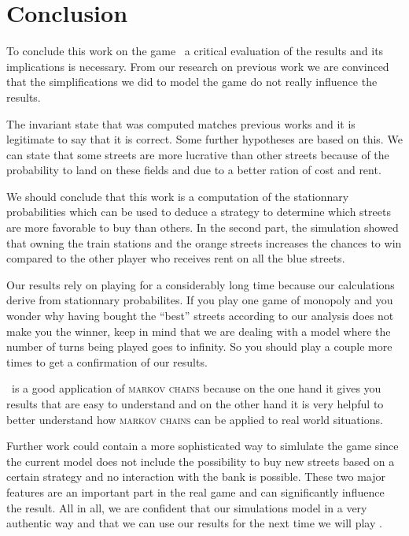 \section{Conclusion} %
\label{sec:conclusion}

To conclude this work on the game \monopoly~a critical evaluation of the results and its 
implications is necessary. From our research on previous work we are convinced that the 
simplifications we did to model the game do not really influence the results. 

The invariant state that was computed matches previous works and it is legitimate to say 
that it is correct. Some further hypotheses are based on this. 
We can state that some streets are more lucrative than other streets because of the 
probability to land on these fields and due to a better ration of cost and rent.

We should conclude that this work is a computation of the stationnary probabilities which can 
be used to deduce a strategy to determine which streets are more favorable to buy than others.
In the second part, the simulation showed that owning the train stations and the orange streets 
increases the chances to win compared to the other player who receives rent on all the blue 
streets. 

Our results rely on playing for a considerably long time because our calculations derive from 
stationnary probabilites. If you play one game of monopoly and you wonder why having bought the ``best'' 
streets according to our analysis does not make you the winner, keep in mind that we are dealing 
with a model where the number of turns being played goes to infinity. So you should play a couple 
more times to get a confirmation of our results.

\monopoly~is a good application of \textsc{markov chains} because on the one hand it gives you results
that are easy to understand and on the other hand it is very helpful to better
understand how \textsc{markov chains} can be applied to real world situations.

Further work could contain a more sophisticated way to simlulate the game since the current model
does not include the possibility to buy new streets based on a certain strategy and no interaction
with the bank is possible. These two major features are an important part in the real game and 
can significantly influence the result. 
All in all, we are confident that our simulations model \monopoly in a 
very authentic way and that we can use our results for the next time we will play \monopoly.


